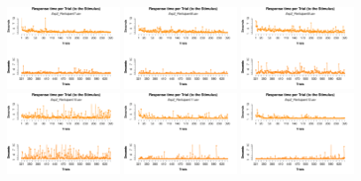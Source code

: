 \begin{figure}[th]
\includegraphics[width=0.30\textwidth]{Figures/RT1_Exp2_P7} \includegraphics[width=0.30\textwidth]{Figures/RT1_Exp2_P8} \includegraphics[width=0.30\textwidth]{Figures/RT1_Exp2_P9}
\includegraphics[width=0.30\textwidth]{Figures/RT1_Exp2_P10} \includegraphics[width=0.30\textwidth]{Figures/RT1_Exp2_P11} \includegraphics[width=0.30\textwidth]{Figures/RT1_Exp2_P12}

\end{figure}
